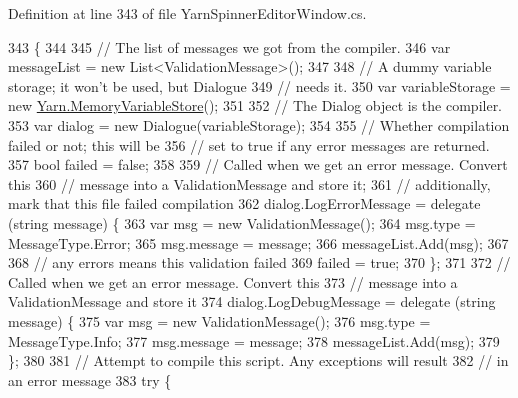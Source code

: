 Definition at line 343 of file Yarn\-Spinner\-Editor\-Window.\-cs.


\begin{DoxyCode}
343                                                                                                            
                        \{
344 
345             \textcolor{comment}{// The list of messages we got from the compiler.}
346             var messageList = \textcolor{keyword}{new} List<ValidationMessage>();
347 
348             \textcolor{comment}{// A dummy variable storage; it won't be used, but Dialogue}
349             \textcolor{comment}{// needs it.}
350             var variableStorage = \textcolor{keyword}{new} \hyperlink{a00128}{Yarn.MemoryVariableStore}();
351 
352             \textcolor{comment}{// The Dialog object is the compiler.}
353             var dialog = \textcolor{keyword}{new} Dialogue(variableStorage);
354 
355             \textcolor{comment}{// Whether compilation failed or not; this will be}
356             \textcolor{comment}{// set to true if any error messages are returned.}
357             \textcolor{keywordtype}{bool} failed = \textcolor{keyword}{false};
358 
359             \textcolor{comment}{// Called when we get an error message. Convert this}
360             \textcolor{comment}{// message into a ValidationMessage and store it;}
361             \textcolor{comment}{// additionally, mark that this file failed compilation}
362             dialog.LogErrorMessage = delegate (\textcolor{keywordtype}{string} message) \{
363                 var msg = \textcolor{keyword}{new} ValidationMessage();
364                 msg.type = MessageType.Error;
365                 msg.message = message;
366                 messageList.Add(msg);
367 
368                 \textcolor{comment}{// any errors means this validation failed}
369                 failed = \textcolor{keyword}{true};
370             \};
371 
372             \textcolor{comment}{// Called when we get an error message. Convert this}
373             \textcolor{comment}{// message into a ValidationMessage and store it}
374             dialog.LogDebugMessage = delegate (\textcolor{keywordtype}{string} message) \{
375                 var msg = \textcolor{keyword}{new} ValidationMessage();
376                 msg.type = MessageType.Info;
377                 msg.message = message;
378                 messageList.Add(msg);
379             \};
380 
381             \textcolor{comment}{// Attempt to compile this script. Any exceptions will result}
382             \textcolor{comment}{// in an error message}
383             \textcolor{keywordflow}{try} \{

\end{DoxyCode}
